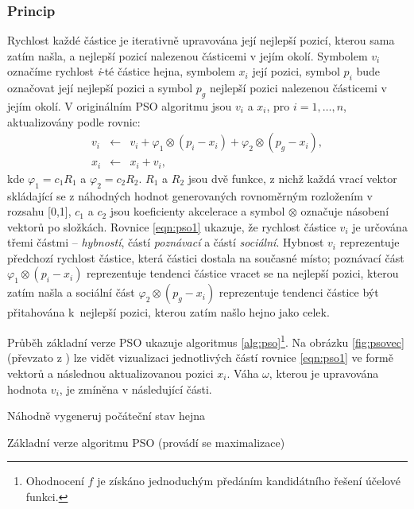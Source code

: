 \documentclass[a4paper,12pt]{article}
\begin{document}
\subsubsection{Princip}
Rychlost každé částice je iterativně upravována její nejlepší pozicí, kterou sama zatím našla, a nejlepší
pozicí nalezenou částicemi v jejím okolí. Symbolem $v_i$ označíme rychlost {\it i}-té částice hejna, symbolem
$x_i$ její pozici, symbol $p_i$ bude označovat její nejlepší pozici a symbol $p_g$ nejlepší pozici nalezenou
částicemi v jejím okolí. V originálním PSO algoritmu jsou $v_i$ a $x_i$, pro $i=1,\dots,n$, aktualizovány
podle rovnic:
\begin{eqnarray}
v_i & \leftarrow & v_i+\varphi_1\otimes(p_i-x_i)+\varphi_2\otimes(p_g-x_i), \label{eqn:pso1} \\
x_i & \leftarrow & x_i + v_i, \label{eqn:pso2}
\end{eqnarray}
kde $\varphi_1=c_1R_1$ a $\varphi_2=c_2R_2$. $R_1$ a $R_2$ jsou dvě funkce, z nichž každá vrací vektor skládající
se z náhodných hodnot generovaných rovnoměrným rozložením v rozsahu [0,1], $c_1$ a $c_2$ jsou koeficienty
akcelerace a symbol $\otimes$ označuje násobení vektorů po složkách. Rovnice \ref{eqn:pso1} ukazuje, že rychlost
částice $v_i$ je určována třemi částmi -- {\it hybností}, částí {\it poznávací} a částí {\it sociální}. Hybnost $v_i$
reprezentuje předchozí rychlost částice, která částici dostala na současné místo; poznávací část
$\varphi_1\otimes(p_i-x_i)$ reprezentuje tendenci částice vracet se na nejlepší pozici, kterou zatím našla a
sociální část $\varphi_2\otimes(p_g-x_i)$ reprezentuje tendenci částice být přitahována k~nejlepší pozici,
kterou zatím našlo hejno jako celek.

Průběh základní verze PSO ukazuje algoritmus \ref{alg:pso}\footnote{Ohodnocení $f$ je získáno jednoduchým předáním
kandidátního řešení účelové funkci.}.
Na obrázku \ref{fig:psovec} (převzato z \cite{Dorigo06antcolony}) lze vidět vizualizaci jednotlivých částí
rovnice \ref{eqn:pso1} ve formě
vektorů a následnou aktualizovanou pozici $x_i$. Váha $\omega$, kterou je upravována hodnota $v_i$, je
zmíněna v následující části.

\begin{algorithm}[here]
  \DontPrintSemicolon
  \SetAlgoNoLine
  Náhodně vygeneruj počáteční stav hejna\;
\caption{Základní verze algoritmu PSO (provádí se maximalizace)\label{alg:pso}}
\end{algorithm}
\end{document}
